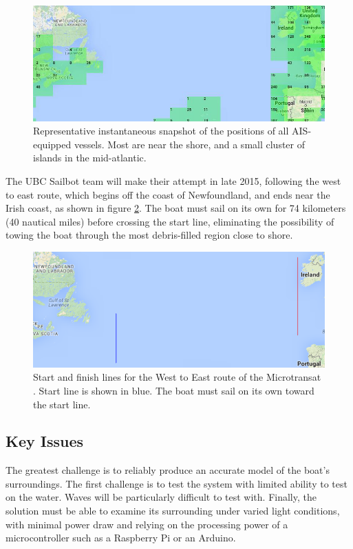 \begin{figure}
\includegraphics[width=150mm,natwidth=792,natheight=313]{"./image/AIS_emitters_north_atlantic"}
\caption[Instantaneous position of AIS vessels.]{\label{fig:ais-snapshot}Representative instantaneous snapshot of the positions of all AIS-equipped vessels. Most are near the shore, and a small cluster of islands in the mid-atlantic.}
\end{figure}

The UBC Sailbot team will make their attempt in late 2015, following the west to east route, which begins off the coast of Newfoundland, and ends near the Irish coast, as shown in figure \ref{fig:w-e_start-finish}. The boat must sail on its own for 74 kilometers (40 nautical miles) before crossing the start line, eliminating the possibility of towing the boat through the most debris-filled region close to shore.

\begin{figure}
\includegraphics[width=150mm,natwidth=667,natheight=264]{"./image/start-finish_map"}
\caption[Microtransat keypoints.]{\label{fig:w-e_start-finish}Start and finish lines for the West to East route of the Microtransat \cite{transat__w-e_start-finish}. Start line is shown in blue. The boat must sail on its own toward the start line. }
\end{figure}

\subsection{\label{sec:intro:key-issues}Key Issues}
The greatest challenge is to reliably produce an accurate model of the boat's surroundings. The first challenge is to test the system with limited ability to test on the water.  Waves will be particularly difficult to test with.  Finally, the solution must be able to examine its surrounding under varied light conditions, with minimal power draw and relying on the processing power of a microcontroller such as a Raspberry Pi or an Arduino.

